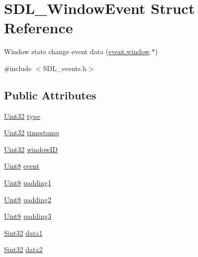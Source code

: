 \hypertarget{struct_s_d_l___window_event}{}\section{S\+D\+L\+\_\+\+Window\+Event Struct Reference}
\label{struct_s_d_l___window_event}


Window state change event data (\hyperlink{union_s_d_l___event_a826936b3275406d857bc6654669fae71}{event.\+window}.$\ast$)  




{\ttfamily \#include $<$S\+D\+L\+\_\+events.\+h$>$}

\subsection*{Public Attributes}
\begin{DoxyCompactItemize}
\item 
\hyperlink{_s_d_l__stdinc_8h_add440eff171ea5f55cb00c4a9ab8672d}{Uint32} \hyperlink{struct_s_d_l___window_event_a01c8c8fbe8564e690f958d2db560f657}{type}
\item 
\hyperlink{_s_d_l__stdinc_8h_add440eff171ea5f55cb00c4a9ab8672d}{Uint32} \hyperlink{struct_s_d_l___window_event_a7b0bf569b20cfa4e3fb76e3301d616f9}{timestamp}
\item 
\hyperlink{_s_d_l__stdinc_8h_add440eff171ea5f55cb00c4a9ab8672d}{Uint32} \hyperlink{struct_s_d_l___window_event_a4b31796ffc84fbb7f6e9ba33e127619a}{window\+ID}
\item 
\hyperlink{_s_d_l__stdinc_8h_a2944638813a090aa23e62f4da842c3e2}{Uint8} \hyperlink{struct_s_d_l___window_event_a485cd1f07f0f22fdb9f4c4bf214011dc}{event}
\item 
\hyperlink{_s_d_l__stdinc_8h_a2944638813a090aa23e62f4da842c3e2}{Uint8} \hyperlink{struct_s_d_l___window_event_a09ee59114246eceed4a281033ec6609b}{padding1}
\item 
\hyperlink{_s_d_l__stdinc_8h_a2944638813a090aa23e62f4da842c3e2}{Uint8} \hyperlink{struct_s_d_l___window_event_a6bcf773b690b894e8c04c591826d0c8a}{padding2}
\item 
\hyperlink{_s_d_l__stdinc_8h_a2944638813a090aa23e62f4da842c3e2}{Uint8} \hyperlink{struct_s_d_l___window_event_ac352263b5fa4ba6dbd64a48062d5e29f}{padding3}
\item 
\hyperlink{_s_d_l__stdinc_8h_a7a90b941db9d4582e9ad7abb9940ff7e}{Sint32} \hyperlink{struct_s_d_l___window_event_a01da0025428d3434c80021f3e4089fec}{data1}
\item 
\hyperlink{_s_d_l__stdinc_8h_a7a90b941db9d4582e9ad7abb9940ff7e}{Sint32} \hyperlink{struct_s_d_l___window_event_af6cd0a21bc9ecadfee42f6a0147d7171}{data2}
\end{DoxyCompactItemize}


